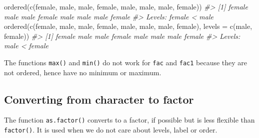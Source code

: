 \documentclass[
]{book}
\newenvironment{Shaded}{\begin{snugshade}}{\end{snugshade}}
\newcommand{\AttributeTok}[1]{\textcolor[rgb]{0.77,0.63,0.00}{#1}}
\newcommand{\CommentTok}[1]{\textcolor[rgb]{0.56,0.35,0.01}{\textit{#1}}}
\newcommand{\FunctionTok}[1]{\textcolor[rgb]{0.00,0.00,0.00}{#1}}
\newcommand{\NormalTok}[1]{#1}
\newcommand{\StringTok}[1]{\textcolor[rgb]{0.31,0.60,0.02}{#1}}
\begin{document}
\begin{Shaded}
\begin{Highlighting}[]
\FunctionTok{ordered}\NormalTok{(}\FunctionTok{c}\NormalTok{(}\StringTok{\textquotesingle{}female\textquotesingle{}}\NormalTok{, }\StringTok{\textquotesingle{}male\textquotesingle{}}\NormalTok{, }\StringTok{\textquotesingle{}male\textquotesingle{}}\NormalTok{, }\StringTok{\textquotesingle{}female\textquotesingle{}}\NormalTok{, }\StringTok{\textquotesingle{}male\textquotesingle{}}\NormalTok{, }\StringTok{\textquotesingle{}male\textquotesingle{}}\NormalTok{, }\StringTok{\textquotesingle{}male\textquotesingle{}}\NormalTok{, }\StringTok{\textquotesingle{}female\textquotesingle{}}\NormalTok{))}
\CommentTok{\#\textgreater{} [1] female male   male   female male   male   male   female}
\CommentTok{\#\textgreater{} Levels: female \textless{} male}
\FunctionTok{ordered}\NormalTok{(}\FunctionTok{c}\NormalTok{(}\StringTok{\textquotesingle{}female\textquotesingle{}}\NormalTok{, }\StringTok{\textquotesingle{}male\textquotesingle{}}\NormalTok{, }\StringTok{\textquotesingle{}male\textquotesingle{}}\NormalTok{, }\StringTok{\textquotesingle{}female\textquotesingle{}}\NormalTok{, }\StringTok{\textquotesingle{}male\textquotesingle{}}\NormalTok{, }\StringTok{\textquotesingle{}male\textquotesingle{}}\NormalTok{, }\StringTok{\textquotesingle{}male\textquotesingle{}}\NormalTok{, }\StringTok{\textquotesingle{}female\textquotesingle{}}\NormalTok{), }
        \AttributeTok{levels =} \FunctionTok{c}\NormalTok{(}\StringTok{\textquotesingle{}male\textquotesingle{}}\NormalTok{, }\StringTok{\textquotesingle{}female\textquotesingle{}}\NormalTok{))}
\CommentTok{\#\textgreater{} [1] female male   male   female male   male   male   female}
\CommentTok{\#\textgreater{} Levels: male \textless{} female}
\end{Highlighting}
\end{Shaded}

The functions \texttt{max()} and \texttt{min()} do not work for \texttt{fac} and \texttt{fac1} because they are not ordered, hence have no minimum or maximum.

\hypertarget{converting-from-character-to-factor}{%
\subsection{Converting from character to factor}\label{converting-from-character-to-factor}}

The function \texttt{as.factor()} converts to a factor, if possible but is less flexible than \texttt{factor()}. It is used when we do not care about levels, label or order.
\end{document}
